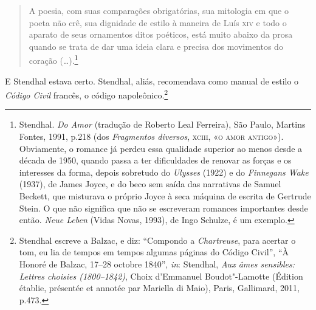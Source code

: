 \begin{quote}
A poesia, com suas comparações obrigatórias, sua mitologia em que o
poeta não crê, sua dignidade de estilo à maneira de Luís \textsc{xiv} e todo o
aparato de seus ornamentos ditos poéticos, está muito abaixo da prosa
quando se trata de dar uma ideia clara e precisa dos movimentos do
coração (\ldots{}).\footnote{Stendhal. \emph{Do Amor} (tradução de Roberto
  Leal Ferreira), São Paulo, Martins Fontes, 1991, p.218 (dos
  \emph{Fragmentos diversos}, \textsc{xciii}, «\textsc{o amor antigo}»). Obviamente, o
  romance já perdeu essa qualidade superior ao menos desde a década de
  1950, quando passa a ter dificuldades de renovar as forças e os
  interesses da forma, depois sobretudo do \emph{Ulysses} (1922) e do
  \emph{Finnegans Wake} (1937), de James Joyce, e do beco sem saída das
  narrativas de Samuel Beckett, que misturava o próprio Joyce à seca
  máquina de escrita de Gertrude Stein. O que não significa que não se
  escreveram romances importantes desde então. \emph{Neue Leben} (Vidas
  Novas, 1993), de Ingo Schulze, é um exemplo.}
\end{quote}

E Stendhal estava certo. Stendhal, aliás, recomendava como manual de
estilo o \emph{Código Civil} francês, o código napoleônico.\footnote{Stendhal
  escreve a Balzac, e diz: ``Compondo a \emph{Chartreuse}, para acertar
  o tom, eu lia de tempos em tempos algumas páginas do Código Civil'',
  ``À Honoré de Balzac, 17--28 octobre 1840'', \emph{in}: Stendhal,
  \emph{Aux âmes sensibles: Lettres choisies (1800--1842)}, Choix
  d'Emmanuel Boudot"-Lamotte (Édition établie, présentée et annotée par
  Mariella di Maio), Paris, Gallimard, 2011, p.473.}

